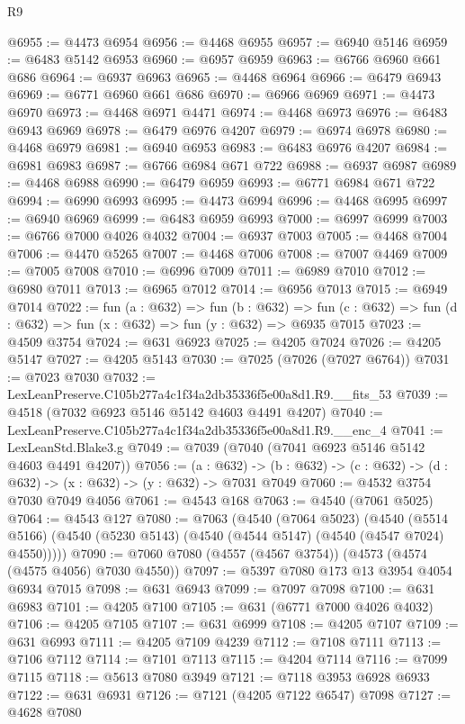 \begin{lexlean}{R9}
\begin{coremodule}
@6955 := @4473 @6954
@6956 := @4468 @6955
@6957 := @6940 @5146
@6959 := @6483 @5142 @6953
@6960 := @6957 @6959
@6963 := @6766 @6960 @661 @686
@6964 := @6937 @6963
@6965 := @4468 @6964
@6966 := @6479 @6943
@6969 := @6771 @6960 @661 @686
@6970 := @6966 @6969
@6971 := @4473 @6970
@6973 := @4468 @6971 @4471
@6974 := @4468 @6973
@6976 := @6483 @6943 @6969
@6978 := @6479 @6976 @4207
@6979 := @6974 @6978
@6980 := @4468 @6979
@6981 := @6940 @6953
@6983 := @6483 @6976 @4207
@6984 := @6981 @6983
@6987 := @6766 @6984 @671 @722
@6988 := @6937 @6987
@6989 := @4468 @6988
@6990 := @6479 @6959
@6993 := @6771 @6984 @671 @722
@6994 := @6990 @6993
@6995 := @4473 @6994
@6996 := @4468 @6995
@6997 := @6940 @6969
@6999 := @6483 @6959 @6993
@7000 := @6997 @6999
@7003 := @6766 @7000 @4026 @4032
@7004 := @6937 @7003
@7005 := @4468 @7004
@7006 := @4470 @5265
@7007 := @4468 @7006
@7008 := @7007 @4469
@7009 := @7005 @7008
@7010 := @6996 @7009
@7011 := @6989 @7010
@7012 := @6980 @7011
@7013 := @6965 @7012
@7014 := @6956 @7013
@7015 := @6949 @7014
@7022 := fun (a : @632) =>
  fun (b : @632) =>
  fun (c : @632) => fun (d : @632) => fun (x : @632) => fun (y : @632) => @6935 @7015
@7023 := @4509 @3754
@7024 := @631 @6923
@7025 := @4205 @7024
@7026 := @4205 @5147
@7027 := @4205 @5143
@7030 := @7025 (@7026 (@7027 @6764))
@7031 := @7023 @7030
@7032 := LexLeanPreserve.C105b277a4c1f34a2db35336f5e00a8d1.R9.__fits_53
@7039 := @4518 (@7032 @6923 @5146 @5142 @4603 @4491 @4207)
@7040 := LexLeanPreserve.C105b277a4c1f34a2db35336f5e00a8d1.R9.__enc_4
@7041 := LexLeanStd.Blake3.g
@7049 := @7039 (@7040 (@7041 @6923 @5146 @5142 @4603 @4491 @4207))
@7056 := (a : @632) ->
  (b : @632) -> (c : @632) -> (d : @632) -> (x : @632) -> (y : @632) -> @7031 @7049
@7060 := @4532 @3754 @7030 @7049 @4056
@7061 := @4543 @168
@7063 := @4540 (@7061 @5025)
@7064 := @4543 @127
@7080 := @7063
    (@4540
      (@7064 @5023)
      (@4540 (@5514 @5166) (@4540 (@5230 @5143) (@4540 (@4544 @5147) (@4540 (@4547 @7024) @4550)))))
@7090 := @7060 @7080 (@4557 (@4567 @3754)) (@4573 (@4574 (@4575 @4056) @7030 @4550))
@7097 := @5397 @7080 @173 @13 @3954 @4054 @6934 @7015
@7098 := @631 @6943
@7099 := @7097 @7098
@7100 := @631 @6983
@7101 := @4205 @7100
@7105 := @631 (@6771 @7000 @4026 @4032)
@7106 := @4205 @7105
@7107 := @631 @6999
@7108 := @4205 @7107
@7109 := @631 @6993
@7111 := @4205 @7109 @4239
@7112 := @7108 @7111
@7113 := @7106 @7112
@7114 := @7101 @7113
@7115 := @4204 @7114
@7116 := @7099 @7115
@7118 := @5613 @7080 @3949
@7121 := @7118 @3953 @6928 @6933
@7122 := @631 @6931
@7126 := @7121 (@4205 @7122 @6547) @7098
@7127 := @4628 @7080

\end{coremodule}
\end{lexlean}
